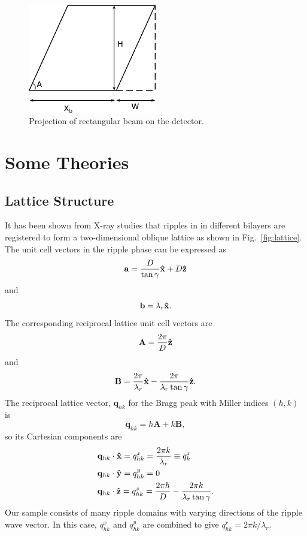 \begin{figure}[htbp]
  \centering
  \includegraphics[width=0.5\textwidth]{figures/ripple/transmission/geometric_broadening4}
  \caption{Projection of rectangular beam on the detector.}
\end{figure}

\newpage
\section{Some Theories}\label{sec:some_theories}
\subsection{Lattice Structure}\label{sec:lattice_structure}
It has been shown from X-ray studies that ripples in in different bilayers
are registered to form a two-dimensional oblique lattice as shown in Fig.~\ref{fig:lattice}. 
The unit cell vectors in the ripple phase can be expressed as 
\begin{equation}
  \mathbf{a} = \frac{D}{\tan\gamma}\mathbf{\hat{x}} + D\mathbf{\hat{z}}
\end{equation}
and
\begin{equation}
  \mathbf{b} = \lambda_r\mathbf{\hat{x}}.
\end{equation}
The corresponding reciprocal lattice unit cell vectors are
\begin{equation}
  \mathbf{A} = \frac{2\pi}{D}\mathbf{\hat{z}}
\end{equation}
and
\begin{equation}
  \mathbf{B} = \frac{2\pi}{\lambda_r}\mathbf{\hat{x}} - \frac{2\pi}{\lambda_r\tan\gamma}\mathbf{\hat{z}}.
\end{equation}
The reciprocal lattice vector, $\mathbf{q}_{hk}$ for the Bragg peak with 
Miller indices $(h,k)$ is 
\begin{equation}
  \mathbf{q}_{hk}=h\mathbf{A}+k\mathbf{B},
\end{equation}
so its Cartesian components are
\begin{align}
  & \mathbf{q}_{hk}\cdot\mathbf{\hat{x}} = q_{hk}^x = \frac{2\pi k}{\lambda_r} \equiv q_{k}^x \\
  & \mathbf{q}_{hk}\cdot\mathbf{\hat{y}} = q_{hk}^y = 0 \\
  & \mathbf{q}_{hk}\cdot\mathbf{\hat{z}} = q_{hk}^z = \frac{2\pi h}{D} - \frac{2\pi k}{\lambda_r\tan\gamma}.
\end{align}
Our sample consists of many ripple domains with varying directions of the
ripple wave vector. In this case, $q_{hk}^x$ and $q_{hk}^y$ are combined to 
give $q_{hk}^r = 2\pi k/\lambda_r$.

